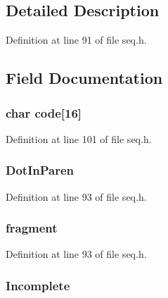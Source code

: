 \subsection{Detailed Description}


Definition at line 91 of file seq.\-h.



\subsection{Field Documentation}
\hypertarget{struct_s_e_q_i_n_f_o_aafca8a0e3be2e005f8cee62f75a48b3c}{
\subsubsection[{code}]{\setlength{\rightskip}{0pt plus 5cm}char code\mbox{[}16\mbox{]}}}\label{struct_s_e_q_i_n_f_o_aafca8a0e3be2e005f8cee62f75a48b3c}


Definition at line 101 of file seq.\-h.

\hypertarget{struct_s_e_q_i_n_f_o_a98a16dc2b509517cc1bb5131d3e90a05}{
\subsubsection[{Dot\-In\-Paren}]{ Dot\-In\-Paren}}\label{struct_s_e_q_i_n_f_o_a98a16dc2b509517cc1bb5131d3e90a05}


Definition at line 93 of file seq.\-h.

\hypertarget{struct_s_e_q_i_n_f_o_a0d8893f1fb00461343fb0847294ef7e2}{
\subsubsection[{fragment}]{ fragment}}\label{struct_s_e_q_i_n_f_o_a0d8893f1fb00461343fb0847294ef7e2}


Definition at line 93 of file seq.\-h.

\hypertarget{struct_s_e_q_i_n_f_o_aa7fc41044d8f4c5818020b2b9e67d059}{
\subsubsection[{Incomplete}]{ Incomplete}}\label{struct_s_e_q_i_n_f_o_aa7fc41044d8f4c5818020b2b9e67d059}


